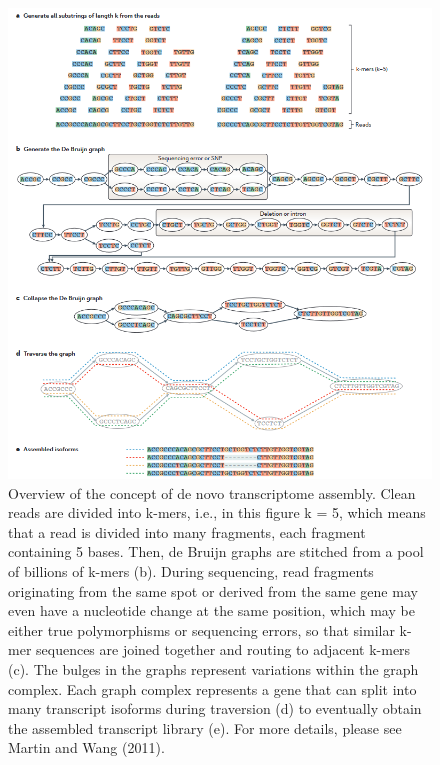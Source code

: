 \documentclass[
  letterpaper,
  DIV=11,
  numbers=noendperiod]{scrreprt}
\begin{document}
\begin{figure}

{\centering \includegraphics{assets/38_denovo_assembly_concept.png}

}

\caption{Overview of the concept of de novo transcriptome assembly.
Clean reads are divided into k-mers, i.e., in this figure k = 5, which
means that a read is divided into many fragments, each fragment
containing 5 bases. Then, de Bruijn graphs are stitched from a pool of
billions of k-mers (b). During sequencing, read fragments originating
from the same spot or derived from the same gene may even have a
nucleotide change at the same position, which may be either true
polymorphisms or sequencing errors, so that similar k-mer sequences are
joined together and routing to adjacent k-mers (c). The bulges in the
graphs represent variations within the graph complex. Each graph complex
represents a gene that can split into many transcript isoforms during
traversion (d) to eventually obtain the assembled transcript library
(e). For more details, please see Martin and Wang (2011).}

\end{figure}
\end{document}
